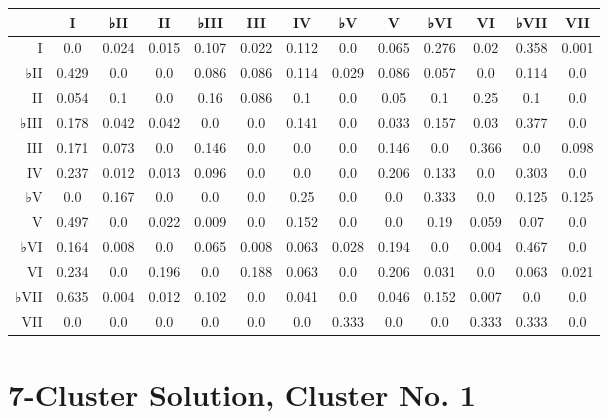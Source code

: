 \begin{table}[htbp]
\begin{minipage}{\linewidth}
\setlength{\tymax}{0.5\linewidth}
\centering
\small
\begin{tabulary}{\textwidth}{@{}RCCCCCCCCCCCC@{}} \toprule
&I&♭II&II&♭III&III&IV&♭V&V&♭VI&VI&♭VII&VII\\
\midrule
I&0.0&0.024&0.015&0.107&0.022&0.112&0.0&0.065&0.276&0.02&0.358&0.001\\
♭II&0.429&0.0&0.0&0.086&0.086&0.114&0.029&0.086&0.057&0.0&0.114&0.0\\
II&0.054&0.1&0.0&0.16&0.086&0.1&0.0&0.05&0.1&0.25&0.1&0.0\\
♭III&0.178&0.042&0.042&0.0&0.0&0.141&0.0&0.033&0.157&0.03&0.377&0.0\\
III&0.171&0.073&0.0&0.146&0.0&0.0&0.0&0.146&0.0&0.366&0.0&0.098\\
IV&0.237&0.012&0.013&0.096&0.0&0.0&0.0&0.206&0.133&0.0&0.303&0.0\\
♭V&0.0&0.167&0.0&0.0&0.0&0.25&0.0&0.0&0.333&0.0&0.125&0.125\\
V&0.497&0.0&0.022&0.009&0.0&0.152&0.0&0.0&0.19&0.059&0.07&0.0\\
♭VI&0.164&0.008&0.0&0.065&0.008&0.063&0.028&0.194&0.0&0.004&0.467&0.0\\
VI&0.234&0.0&0.196&0.0&0.188&0.063&0.0&0.206&0.031&0.0&0.063&0.021\\
♭VII&0.635&0.004&0.012&0.102&0.0&0.041&0.0&0.046&0.152&0.007&0.0&0.0\\
VII&0.0&0.0&0.0&0.0&0.0&0.0&0.333&0.0&0.0&0.333&0.333&0.0\\

\bottomrule

\end{tabulary}
\end{minipage}
\end{table}

\section{7-Cluster Solution, Cluster No. 1}
\label{7-clustersolutionclusterno.1}

